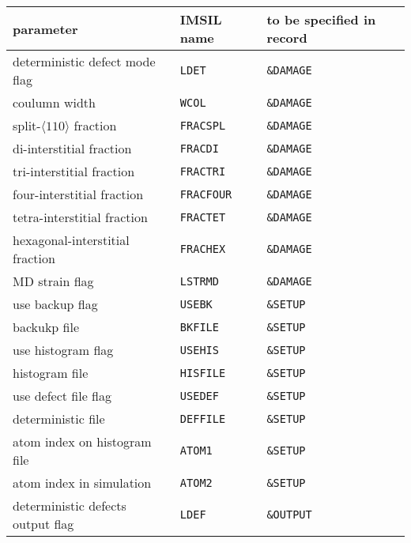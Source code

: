 \begin{center}
\begin{tabular}{lll}
   parameter \quad & IMSIL name & to be specified in record \\
   \hline
   deterministic defect mode flag    & {\tt LDET}     & {\tt \&DAMAGE} \\
   coulumn width                     & {\tt WCOL}     & {\tt \&DAMAGE} \\
   split-$\langle 110 \rangle$ fraction   
                                     & {\tt FRACSPL}  & {\tt \&DAMAGE} \\
   di-interstitial fraction          & {\tt FRACDI}   & {\tt \&DAMAGE} \\
   tri-interstitial fraction         & {\tt FRACTRI}  & {\tt \&DAMAGE} \\
   four-interstitial fraction        & {\tt FRACFOUR} & {\tt \&DAMAGE} \\
   tetra-interstitial fraction       & {\tt FRACTET}  & {\tt \&DAMAGE} \\
   hexagonal-interstitial fraction   & {\tt FRACHEX}  & {\tt \&DAMAGE} \\
   MD strain flag                    & {\tt LSTRMD}   & {\tt \&DAMAGE} \\
   use backup flag                   & {\tt USEBK}    & {\tt \&SETUP}  \\
   backukp file                      & {\tt BKFILE}   & {\tt \&SETUP}  \\
   use histogram flag                & {\tt USEHIS}   & {\tt \&SETUP}  \\
   histogram file                    & {\tt HISFILE}  & {\tt \&SETUP}  \\
   use defect file flag              & {\tt USEDEF}   & {\tt \&SETUP}  \\
   deterministic file                & {\tt DEFFILE}  & {\tt \&SETUP}  \\
   atom index on histogram file      & {\tt ATOM1}    & {\tt \&SETUP}  \\
   atom index in simulation          & {\tt ATOM2}    & {\tt \&SETUP}  \\
   deterministic defects output flag & {\tt LDEF}     & {\tt \&OUTPUT} \\
\end{tabular}
\end{center}

